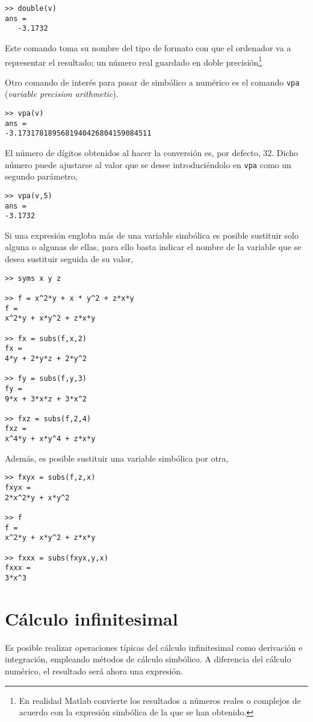 \begin{verbatim}
>> double(v)
ans =
   -3.1732
\end{verbatim}
Este comando toma su nombre del tipo de formato con que el ordenador va a representar el resultado; un número real guardado en doble precisión\footnote{En realidad Matlab convierte los resultados a números reales o complejos de acuerdo con la expresión simbólica de la que se han obtenido.}

Otro comando de interés para pasar de simbólico a numérico es el comando \texttt{vpa} (\emph{variable precision arithmetic}).
\begin{verbatim}
>> vpa(v) 
ans = 
-3.1731781895681940426804159084511
\end{verbatim}
El número de dígitos obtenidos al hacer la conversión es, por defecto, $32$. Dicho número puede ajustarse al 
valor que se desee introduciéndolo en \texttt{vpa} como un segundo parámetro,

\begin{verbatim}
>> vpa(v,5) 
ans = 
-3.1732
\end{verbatim}

Si una expresión engloba más  de una variable simbólica es posible sustituir solo alguna o algunas de ellas, para ello basta indicar el nombre de la variable que se desea sustituir seguida de su valor,
\begin{verbatim}
>> syms x y z

>> f = x^2*y + x * y^2 + z*x*y 
f = 
x^2*y + x*y^2 + z*x*y
 
>> fx = subs(f,x,2) 
fx = 
4*y + 2*y*z + 2*y^2
 
>> fy = subs(f,y,3) 
fy = 
9*x + 3*x*z + 3*x^2
 
>> fxz = subs(f,2,4) 
fxz = 
x^4*y + x*y^4 + z*x*y
\end{verbatim}
 
Además, es posible sustituir una variable simbólica por otra,

\begin{verbatim}
>> fxyx = subs(f,z,x) 
fxyx = 
2*x^2*y + x*y^2
 
>> f 
f = 
x^2*y + x*y^2 + z*x*y
 
>> fxxx = subs(fxyx,y,x) 
fxxx = 
3*x^3
\end{verbatim}


\section{Cálculo infinitesimal}
Es posible realizar operaciones típicas del cálculo infinitesimal como derivación e integración, empleando métodos de cálculo simbólico. A diferencia del cálculo numérico, el resultado será ahora una expresión. 


